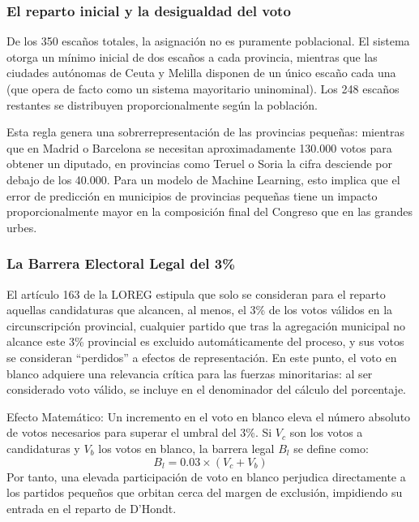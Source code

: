 \subsubsection{El reparto inicial y la desigualdad del voto}
De los 350 escaños totales, la asignación no es puramente poblacional. El sistema otorga un mínimo inicial de dos escaños a cada provincia, mientras que las ciudades autónomas de Ceuta y Melilla disponen de un único escaño cada una (que opera de facto como un sistema mayoritario uninominal). Los 248 escaños restantes se distribuyen proporcionalmente según la población.

Esta regla genera una sobrerrepresentación de las provincias pequeñas: mientras que en Madrid o Barcelona se necesitan aproximadamente 130.000 votos para obtener un diputado, en provincias como Teruel o Soria la cifra desciende por debajo de los 40.000. Para un modelo de Machine Learning, esto implica que el error de predicción en municipios de provincias pequeñas tiene un impacto proporcionalmente mayor en la composición final del Congreso que en las grandes urbes.

\subsubsection{La Barrera Electoral Legal del 3\%}
El artículo 163 de la LOREG estipula que solo se consideran para el reparto aquellas candidaturas que alcancen, al menos, el 3\% de los votos válidos en la circunscripción provincial, cualquier partido que tras la agregación municipal no alcance este 3\% provincial es excluido automáticamente del proceso, y sus votos se consideran ``perdidos'' a efectos de representación. En este punto, el voto en blanco adquiere una relevancia crítica para las fuerzas minoritarias: al ser considerado voto válido, se incluye en el denominador del cálculo del porcentaje.

Efecto Matemático: Un incremento en el voto en blanco eleva el número absoluto de votos necesarios para superar el umbral del 3\%. Si $V_{c}$ son los votos a candidaturas y $V_{b}$ los votos en blanco, la barrera legal $B_{l}$ se define como:
\begin{equation}
B_{l} = 0.03 \times (V_{c} + V_{b})
\end{equation}
Por tanto, una elevada participación de voto en blanco perjudica directamente a los partidos pequeños que orbitan cerca del margen de exclusión, impidiendo su entrada en el reparto de D'Hondt.

